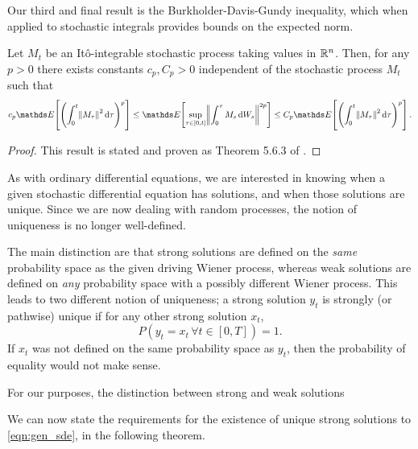 Our third and final result is the Burkholder-Davis-Gundy inequality, which when applied to stochastic integrals provides bounds on the expected norm.
\begin{theorem}\label{thm:bdg}
	Let \(M_t\) be an It\^o-integrable stochastic process taking values in \(\mathbb{R}^n\).
	Then, for any \(p > 0\) there exists constants \(c_p, C_p > 0\) independent of the stochastic process \(M_t\) such that
	\[
		c_p\avg{\left(\int_0^t{\norm{M_\tau}^2\dif \tau}\right)^p} \leq \avg{\sup_{\tau \in \left[0, t\right]}\norm{\int_0^\tau{M_s\dif W_s}}^{2p}} \leq C_p\avg{\left(\int_0^t{\norm{M_\tau}^2\dif \tau}\right)^p}.
	\]
\end{theorem}
\begin{proof}
	This result is stated and proven as Theorem 5.6.3 of \citet{KallianpurSundar_2014_StochasticAnalysisDiffusion}.
\end{proof}

As with ordinary differential equations, we are interested in knowing when a given stochastic differential equation has solutions, and when those solutions are unique.
Since we are now dealing with random processes, the notion of uniqueness is no longer well-defined.

The main distinction are that strong solutions are defined on the \emph{same} probability space as the given driving Wiener process, whereas weak solutions are defined on \emph{any} probability space with a possibly different Wiener process.
This leads to two different notion of uniqueness; a strong solution \(y_t\) is strongly (or pathwise) unique if for any other strong solution \(x_t\),
\[
	P\left(y_t = x_t \, \forall t \in [0,T]\right) = 1.
\]
If \(x_t\) was not defined on the same probability space as \(y_t\), then the probability of equality would not make sense.

For our purposes, the distinction between strong and weak solutions

We can now state the requirements for the existence of unique strong solutions to \eqref{eqn:gen_sde}, in the following theorem.

